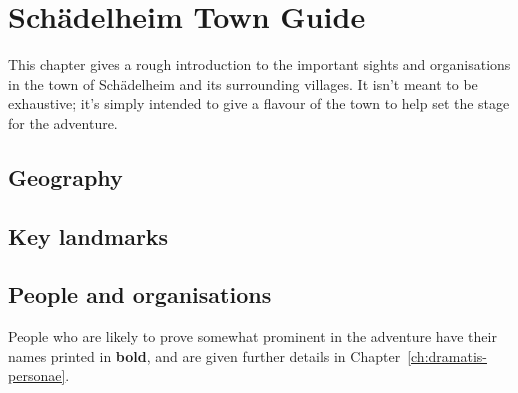 \chapter{Sch{\"a}delheim Town Guide}\label{ch:weissbruck}

This chapter gives a rough introduction to the important sights and
organisations in the town of Sch{\"a}delheim and its surrounding villages. It
isn't meant to be exhaustive; it's simply intended to give a flavour of the town
to help set the stage for the adventure.

\section{Geography}

\section{Key landmarks}

\section{People and organisations}
People who are likely to prove somewhat prominent in the adventure have their
names printed in \textbf{bold}, and are given further details in
Chapter~\ref{ch:dramatis-personae}.
